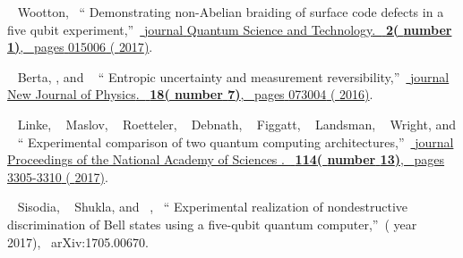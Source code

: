 \documentclass[aps,pra,twocolumn,groupedaddress,showpacs,showkeys]{revtex4-1}
\begin{document}
\begin{thebibliography}{27}
  \BibitemOpen
   { {~\bibnamefont
  {Wootton}},\ }  {\enquote { {Demonstrating non-Abelian braiding of surface code defects in a five qubit experiment},}\ }\href {\doibase 10.1088/2058-9565/aa5c73} { {\bibinfo
  {journal} {Quantum Science and Technology}.\ }\textbf { {2}(\bibinfo
  {number} {1})},\ \bibinfo
  {pages} {015006} ( {2017})}.%

  \BibitemOpen
   { {~\bibnamefont
  {Berta}}, , and \ }  {\enquote { {Entropic uncertainty and measurement reversibility},}\ }\href {\doibase 10.1088/1367-2630/18/7/073004} { {\bibinfo
  {journal} {New Journal of Physics}.\ }\textbf { {18}(\bibinfo
  {number} {7})},\ \bibinfo
  {pages} {073004} ( {2016})}.%
  
  \BibitemOpen
   { {~\bibnamefont
  {Linke}}, ~\bibnamefont
  {Maslov}, ~\bibnamefont
  {Roetteler}, ~\bibnamefont
  {Debnath}, ~\bibnamefont
  {Figgatt}, ~\bibnamefont
  {Landsman}, ~\bibnamefont
  {Wright}, and  \ }  {\enquote { {Experimental comparison of two quantum computing architectures},}\ }\href {\doibase 10.1073/pnas.1618020114} { {\bibinfo
  {journal} {Proceedings of the National Academy of Sciences }.\ }  \textbf { {114}(\bibinfo
  {number} {13})},\ \bibinfo
  {pages} {3305-3310} ( {2017})}.%
  
  \BibitemOpen
   { {~\bibnamefont
  {Sisodia}},  {~\bibnamefont
  {Shukla}}, and\  {},\ }  {\enquote { {Experimental realization of nondestructive discrimination of Bell states using a five-qubit quantum computer},}\ }(\bibinfo
  {year} {2017}),\ 
  {arXiv:1705.00670}.%


\end{thebibliography}
\end{document}
